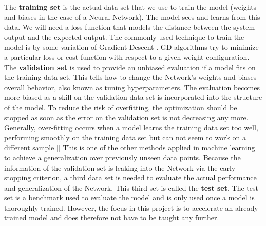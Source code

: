 The \textbf{training set} is the actual data set that we use to train the model (weights and biases in the case of a Neural Network). The model sees and learns from this data. 
We will need a loss function that models the distance between the system output and the expected output.
The commonly used technique to train the model is by some variation of Gradient Descent . GD algorithms try to minimize a particular loss or cost function with respect to a given weight configuration.
The \textbf{validation set} is used to provide an unbiased evaluation if a model fits on the training data-set. This tells how to change the Network's weights and biases overall behavior, also known as tuning hyperparameters. The evaluation becomes more biased as a skill on the validation data-set is incorporated into the structure of the model. To reduce the risk of overfitting, the optimization
should be stopped as soon as the error on the validation set is not decreasing
any more. 
Generally, over-fitting occurs when a model learns the training data set too well, performing smoothly on the training data set but can not seem to work on a different sample [\cite{Kriesel2007NeuralNetworks}] 
This is one of the other methods applied in machine learning to achieve a generalization over previously unseen data points. Because the information of the validation set is leaking into the Network via the early stopping criterion, a third data set is needed to evaluate the actual performance and generalization of the Network. This third set is called the \textbf{test set}.
The test set is a benchmark used to evaluate the model and is only used once a model is thoroughly trained. However, the focus in this project is to accelerate an already trained model and does therefore not have to be taught any further.

